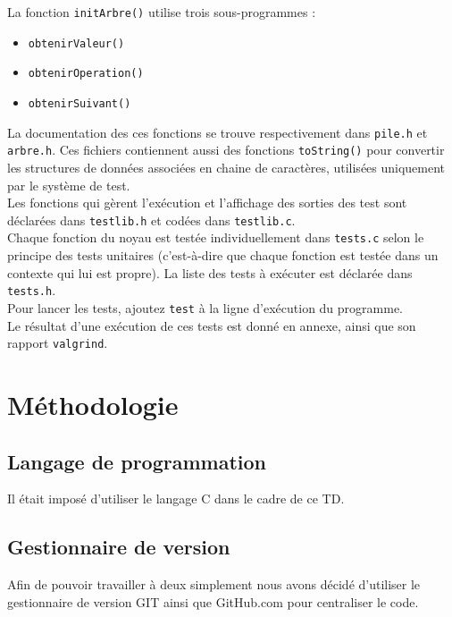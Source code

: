 \documentclass[a4paper,11pt] {article}
\begin{document}
\vspace{0.5cm}

La fonction \verb#initArbre()# utilise trois sous-programmes : 

\vspace{0.5cm}

\begin{itemize}
    \item \verb#obtenirValeur()#
    \item \verb#obtenirOperation()#
    \item \verb#obtenirSuivant()#
\end{itemize}

\vspace{0.5cm}

La documentation des ces fonctions se trouve respectivement dans \verb#pile.h# et \verb#arbre.h#. Ces fichiers contiennent aussi des fonctions \verb#toString()# pour convertir les structures de données associées en chaine de caractères, utilisées uniquement par le système de test.\\

Les fonctions qui gèrent l'exécution et l'affichage des sorties des test sont déclarées dans \verb#testlib.h# et codées dans \verb#testlib.c#.\\

Chaque fonction du noyau est testée individuellement dans \verb#tests.c# selon le principe des tests unitaires (c'est-à-dire que chaque fonction est testée dans un contexte qui lui est propre). La liste des tests à exécuter est déclarée dans \verb#tests.h#.\\

Pour lancer les tests, ajoutez \verb#test# à la ligne d'exécution du programme.\\

Le résultat d'une exécution de ces tests est donné en annexe, ainsi que son rapport \verb?valgrind?.\\

\section{Méthodologie}
\subsection{Langage de programmation}
Il était imposé d'utiliser le langage C dans le cadre de ce TD.
\subsection{Gestionnaire de version}
Afin de pouvoir travailler à deux simplement nous avons décidé d'utiliser le gestionnaire de version GIT ainsi que GitHub.com pour centraliser le code.
\end{document}
